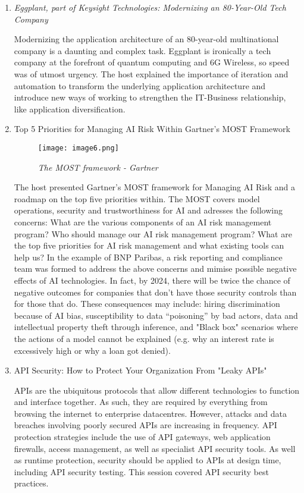 \begin{enumerate}
    \item \color{dgreen} \textit{Eggplant, part of Keysight Technologies: Modernizing an 80-Year-Old Tech Company}
    
    \color{black} Modernizing the application architecture of an 80-year-old multinational company is a daunting and complex task. Eggplant is ironically a tech company at the forefront of quantum computing and 6G Wireless, so speed was of utmost urgency. The host explained the importance of iteration and automation to transform the underlying application architecture and introduce new ways of working to strengthen the IT-Business relationship, like application diversification.

    \item \color{dgreen} Top 5 Priorities for Managing AI Risk Within Gartner’s MOST Framework
    
    \begin{figure}[H]
        \centering
            \texttt{[image: image6.png]}
            \caption*{\textit{The MOST framework - Gartner}}
    \end{figure}

    \color{black} The host presented Gartner's MOST framework for Managing AI Risk and a roadmap on the top five priorities within. The MOST covers model operations, security and trustworthiness for AI and adresses the following concerns: What are the various components of an AI risk management program? Who should manage our AI risk management program? What are the top five priorities for AI risk management and what existing tools can help us? In the example of BNP Paribas, a risk reporting and compliance team was formed to address the above concerns and mimise possible negative effects of AI technologies. In fact, by 2024, there will be twice the chance of negative outcomes for companies that don't have those security controls than for those that do. These consequences may include: hiring discrimination because of AI bias, susceptibility to data “poisoning” by bad actors, data and intellectual property theft through inference, and "Black box" scenarios where the actions of a model cannot be explained (e.g. why an interest rate is excessively high or why a loan got denied).

    \item \color{dgreen} API Security: How to Protect Your Organization From "Leaky APIs"

    \color{black} APIs are the ubiquitous protocols that allow different technologies to function and interface together. As such, they are required by everything from browsing the internet to enterprise datacentres. However, attacks and data breaches involving poorly secured APIs are increasing in frequency. API protection strategies include the use of API gateways, web application firewalls, access management, as well as specialist API security tools. As well as runtime protection, security should be applied to APIs at design time, including API security testing. This session covered API security best practices.
\end{enumerate}

